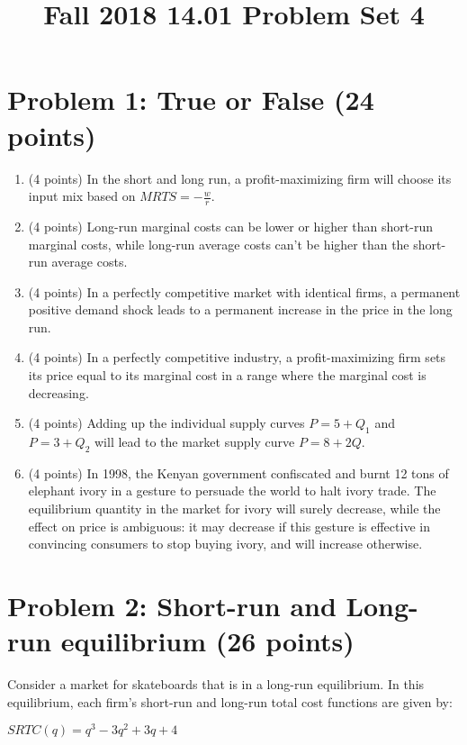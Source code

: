 \documentclass{article}
\begin{document}
\title{Fall 2018 14.01 Problem Set 4}
\maketitle

\section{Problem 1: True or False (24 points)}

\begin{enumerate}
  \item (4 points) In the short and long run, a profit-maximizing firm will choose its input mix based on $MRTS = -\frac{w}{r}$.
  \item (4 points) Long-run marginal costs can be lower or higher than short-run marginal costs, while long-run average costs can’t be higher than the short-run average costs.
  \item (4 points) In a perfectly competitive market with identical firms, a permanent positive demand shock leads to a permanent increase in the price in the long run.
  \item (4 points) In a perfectly competitive industry, a profit-maximizing firm sets its price equal to its marginal cost in a range where the marginal cost is decreasing.
  \item (4 points) Adding up the individual supply curves $P = 5 + Q_1$ and $P = 3 + Q_2$ will lead to the market supply curve $P = 8 + 2Q$.
  \item (4 points) In 1998, the Kenyan government confiscated and burnt 12 tons of elephant ivory in a gesture to persuade the world to halt ivory trade. The equilibrium quantity in the market for ivory will surely decrease, while the effect on price is ambiguous: it may decrease if this gesture is effective in convincing consumers to stop buying ivory, and will increase otherwise.
\end{enumerate}


\section{Problem 2: Short-run and Long-run equilibrium (26 points)}

Consider a market for skateboards that is in a long-run equilibrium. In this equilibrium, each firm’s short-run and long-run total cost functions are given by:

$SRTC(q) = q^3 - 3q^2 + 3q + 4$
\end{document}
